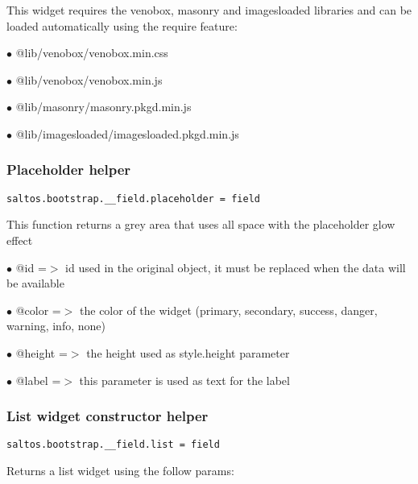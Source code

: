 \documentclass[a4paper]{article}
\begin{document}
This widget requires the venobox, masonry and imagesloaded libraries and can be loaded
automatically using the require feature:

\begin{compactitem}
\item[\color{myblue}$\bullet$] @lib/venobox/venobox.min.css
\item[\color{myblue}$\bullet$] @lib/venobox/venobox.min.js
\item[\color{myblue}$\bullet$] @lib/masonry/masonry.pkgd.min.js
\item[\color{myblue}$\bullet$] @lib/imagesloaded/imagesloaded.pkgd.min.js
\end{compactitem}

\hypertarget{toc643}{}
\subsubsection{Placeholder helper}

\begin{lstlisting}
saltos.bootstrap.__field.placeholder = field
\end{lstlisting}

This function returns a grey area that uses all space with the placeholder glow effect

\begin{compactitem}
\item[\color{myblue}$\bullet$] @id     =$>$ id used in the original object, it must be replaced when the data will be available
\item[\color{myblue}$\bullet$] @color  =$>$ the color of the widget (primary, secondary, success, danger, warning, info, none)
\item[\color{myblue}$\bullet$] @height =$>$ the height used as style.height parameter
\item[\color{myblue}$\bullet$] @label  =$>$ this parameter is used as text for the label
\end{compactitem}

\hypertarget{toc644}{}
\subsubsection{List widget constructor helper}

\begin{lstlisting}
saltos.bootstrap.__field.list = field
\end{lstlisting}

Returns a list widget using the follow params:
\end{document}
